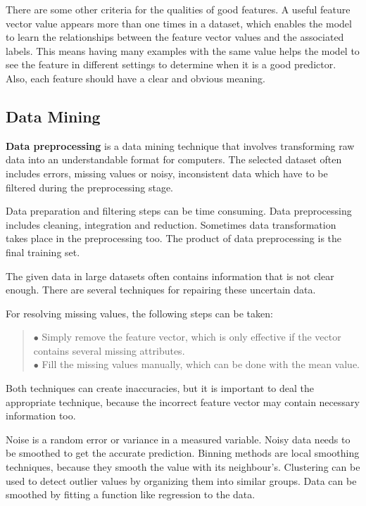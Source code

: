 There are some other criteria for the qualities of good features. A useful feature vector value appears more than one times in a dataset, which enables the model to learn the relationships between the feature vector values and the associated labels. This means having many examples with the same value helps the model to see the feature in different settings to determine when it is a good predictor. Also, each feature should have a clear and obvious meaning.


\subsection{Data Mining}

\textbf{Data preprocessing} \cite{pyle1999data} is a data mining technique that involves transforming raw data into an understandable format for computers. The selected dataset often includes errors, missing values or noisy, inconsistent data which have to be filtered during the preprocessing stage. \medskip

Data preparation and filtering steps can be time consuming. Data preprocessing includes cleaning, integration and reduction. Sometimes data transformation takes place in the preprocessing too. The product of data preprocessing is the final training set.\medskip

The given data in large datasets often contains information that is not clear enough. There are several techniques for repairing these uncertain data. \bigskip

\noindent For resolving missing values, the following steps can be taken:
\begin{verse}
	$\bullet$ Simply remove the feature vector, which is only effective if the vector contains several missing attributes.\\
	$\bullet$ Fill the missing values manually, which can be done with the mean value.
\end{verse}

Both techniques can create inaccuracies, but it is important to deal the appropriate technique, because the incorrect feature vector may contain necessary information too. \bigskip

Noise is a random error or variance in a measured variable. Noisy data needs to be smoothed to get the accurate prediction. Binning methods are local smoothing techniques, because they smooth the value with its neighbour's. Clustering can be used to detect outlier values by organizing them into similar groups. Data can be smoothed by fitting a function like regression to the data.\medskip

